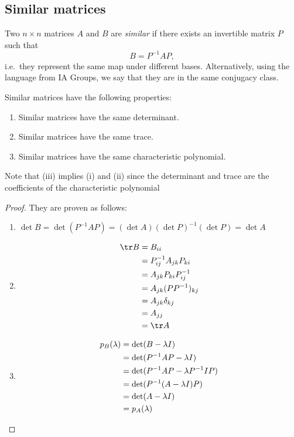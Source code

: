 \documentclass[a4paper]{article}
\begin{document}
\subsection{Similar matrices}
\begin{defi}
  Two $n\times n$ matrices $A$ and $B$ are \emph{similar} if there exists an invertible matrix $P$ such that
  \[
    B = P^{-1}AP,
  \]
  i.e.\ they represent the same map under different bases. Alternatively, using the language from IA Groups, we say that they are in the same conjugacy class.
\end{defi}

\begin{prop}
  Similar matrices have the following properties:
  \begin{enumerate}
    \item Similar matrices have the same determinant.
    \item Similar matrices have the same trace.
    \item Similar matrices have the same characteristic polynomial.
  \end{enumerate}
\end{prop}
Note that (iii) implies (i) and (ii) since the determinant and trace are the coefficients of the characteristic polynomial

\begin{proof}
  They are proven as follows:
  \begin{enumerate}
    \item $\det B =\det (P^{-1}AP) = (\det A) (\det P)^{-1} (\det P) = \det A$
    \item
      \begin{align*}
        \tr B &= B_{ii}\\
        &= P_{ij}^{-1} A_{jk} P_{ki}\\
        &= A_{jk} P_{ki}P_{ij}^{-1}\\
        &= A_{jk}(PP^{-1})_{kj}\\
        &= A_{jk}\delta_{kj}\\
        &= A_{jj}\\
        &= \tr A
      \end{align*}
    \item
      \begin{align*}
        p_B(\lambda) &= \det(B - \lambda I)\\
        &= \det(P^{-1}AP - \lambda I)\\
        &= \det(P^{-1}AP - \lambda P^{-1}IP)\\
        &= \det(P^{-1}(A - \lambda I)P)\\
        &= \det(A - \lambda I)\\
        &= p_A(\lambda)\qedhere
      \end{align*}%
  \end{enumerate}
\end{proof}
\end{document}
